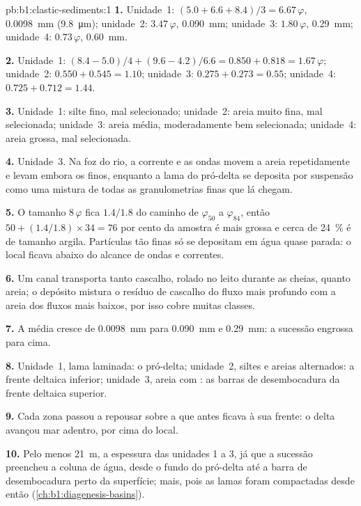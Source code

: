 \begin{solution}{pb:b1:clastic-sediments:1}
\textbf{1.} Unidade~1: $(5.0 + 6.6 + 8.4)/3 = 6.67\,\varphi$, \qty{0.0098}{mm}
(\qty{9.8}{\micro m}); unidade~2: $3.47\,\varphi$, \qty{0.090}{mm}; unidade~3:
$1.80\,\varphi$, \qty{0.29}{mm}; unidade~4: $0.73\,\varphi$, \qty{0.60}{mm}.

\textbf{2.} Unidade~1: $(8.4 - 5.0)/4 + (9.6 - 4.2)/6.6 = 0.850 + 0.818 =
1.67\,\varphi$; unidade~2: $0.550 + 0.545 = 1.10$; unidade~3: $0.275 + 0.273 = 0.55$;
unidade~4: $0.725 + 0.712 = 1.44$.

\textbf{3.} Unidade~1: silte fino, mal selecionado; unidade~2: areia muito fina, mal
selecionada; unidade~3: areia média, moderadamente bem selecionada; unidade~4: areia
grossa, mal selecionada.

\textbf{4.} Unidade~3. Na foz do rio, a corrente e as ondas movem a areia repetidamente
e levam embora os finos, enquanto a lama do pró-delta se deposita por suspensão como uma
mistura de todas as granulometrias finas que lá chegam.

\textbf{5.} O tamanho $8\,\varphi$ fica $1.4/1.8$ do caminho de $\varphi_{50}$ a
$\varphi_{84}$, então $50 + (1.4/1.8) \times 34 = 76$ por cento da amostra é mais grossa
e cerca de \qty{24}{\percent} é de tamanho argila. Partículas tão finas só se depositam
em água quase parada: o local ficava abaixo do alcance de ondas e correntes.

\textbf{6.} Um canal transporta tanto cascalho, rolado no leito durante as cheias, quanto
areia; o depósito mistura o resíduo de cascalho do fluxo mais profundo com a areia dos
fluxos mais baixos, por isso cobre muitas classes.

\textbf{7.} A média cresce de \qty{0.0098}{mm} para \qty{0.090}{mm} e \qty{0.29}{mm}: a
sucessão engrossa para cima.

\textbf{8.} Unidade~1, lama laminada: o pró-delta; unidade~2, siltes e areias alternados:
a frente deltaica inferior; unidade~3, areia com : as barras de
desembocadura da frente deltaica superior.

\textbf{9.} Cada zona passou a repousar sobre a que antes ficava à sua frente: o delta
avançou mar adentro, por cima do local.

\textbf{10.} Pelo menos \qty{21}{m}, a espessura das unidades 1 a 3, já que a sucessão
preencheu a coluna de água, desde o fundo do pró-delta até a barra de desembocadura perto da
superfície; mais, pois as lamas foram compactadas desde então
(\cref{ch:b1:diagenesis-basins}).


\end{solution}

